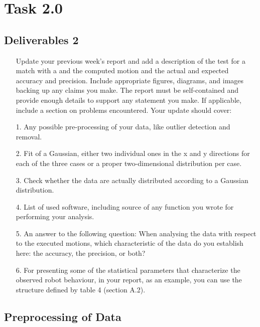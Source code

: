 

    \chapter{Task 2.0}
    \section{Deliverables 2}
    \begin{itemize}
        \item[] Update your previous week’s report and add a description of the test for a match with a and the computed motion and the actual and expected accuracy and precision. Include appropriate figures, diagrams, and images backing up any claims you make. The report must be self-contained and provide enough details to support any statement you make. If applicable, include a section on problems encountered. Your update should cover:
    \end{itemize}
    
    \begin{itemize}
        \item[1.] Any possible pre-processing of your data, like outlier detection and removal.
        \item[2.] Fit of a Gaussian, either two individual ones in the x and y directions for each of the three cases or a proper two-dimensional distribution per case.
        \item[3.] Check whether the data are actually distributed according to a Gaussian distribution.
        \item[4.] List of used software, including source of any function you wrote for performing your analysis.
        \item[5.] An answer to the following question: When analysing the data with respect to the executed motions, which characteristic of the data do you establish here: the accuracy, the precision, or both?
        \item[6.] For presenting some of the statistical parameters that characterize the observed robot behaviour, in your report, as an example, you can use the structure defined by table 4 (section A.2).
    \end{itemize}
    
    \section{Preprocessing of Data}
    
